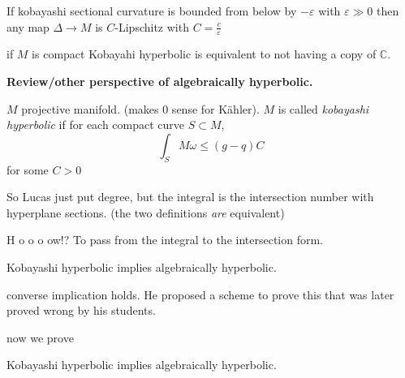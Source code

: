 \begin{proposition}[Claim]
\label{proposition-ah-curvature-claim}
If kobayashi sectional curvature is bounded
from below by $-\varepsilon$ with
$\varepsilon\gg 0$ then any map $\Delta \to
M$ is $C$-Lipschitz with
$C=\frac{c}{\varepsilon}$
\end{proposition}

\begin{theorem}[Brody]
\label{theorem-ah-brody}
if $M$ is compact Kobayahi hyperbolic is
equivalent to not having a copy of
$\mathbb{C}$.
\end{theorem}

\medskip\noindent
{\bf Review/other perspective of
algebraically hyperbolic.}

\begin{definition}
\label{definition-ah-alg-hyperbolic}
$M$ projective manifold. (makes 0 sense for
Kähler). $M$ is called {\it kobayashi
hyperbolic} if for each compact curve $S
\subset M$,
$$
\int_{S}M\omega\leq (g-q)C
$$
for some $C>0$
\end{definition}

\begin{remark}
\label{remark-ah-degree}
So Lucas just put degree, but the integral is
the intersection number with hyperplane
sections. (the two definitions {\it are}
equivalent)
\end{remark}

\begin{remark}[Question]
\label{remark-ah-question-integral}
H o o o ow!? To pass from the integral to the
intersection form.
\end{remark}

\begin{theorem}[Who?]
\label{theorem-ah-koba-implies-alg-first}
Kobayashi hyperbolic implies algebraically
hyperbolic.
\end{theorem}

\begin{remark}
\label{remark-ah-demailly-conjecture}
converse implication holds. He proposed a
scheme to prove this that was later proved
wrong by his students.
\end{remark}

now we prove

\begin{theorem}[Who?]
\label{theorem-ah-koba-implies-alg-second}
Kobayashi hyperbolic implies algebraically
hyperbolic.
\end{theorem}


